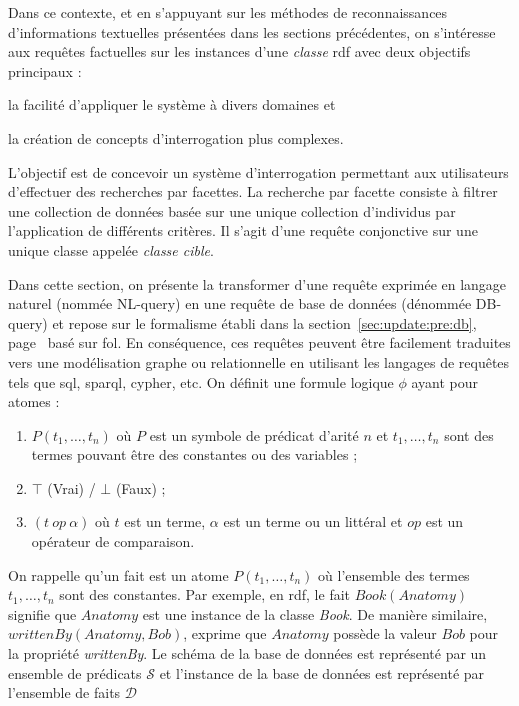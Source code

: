 Dans ce contexte, et en s'appuyant sur les méthodes de reconnaissances d'informations textuelles présentées dans les sections précédentes, on s'intéresse aux requêtes factuelles sur les instances d'une \emph{classe} \gls{rdf} avec deux objectifs principaux :
\begin{enumerate*}[label=(\roman*)]
    \item la facilité d'appliquer le système à divers domaines et
    \item la création de concepts d'interrogation plus complexes.
\end{enumerate*}
L'objectif est de concevoir un système d'interrogation permettant aux utilisateurs d'effectuer des recherches par facettes.
La recherche par facette consiste à filtrer une collection de données basée sur une unique collection d'individus par l'application de différents critères.
Il s'agit d'une requête conjonctive sur une unique classe appelée \emph{classe cible}.

Dans cette section, on présente la transformer d'une requête exprimée en langage naturel (nommée NL-query) en une requête de base de données (dénommée DB-query) \cite{amaviNaturalLanguageQuerying2020} et repose sur le formalisme établi dans la section~\ref{sec:update:pre:db}, page~\pageref{sec:update:pre:db} basé sur \gls{fol}.
En conséquence, ces requêtes peuvent être facilement traduites vers une modélisation graphe ou relationnelle en utilisant les langages de requêtes tels que \gls{sql}, \gls{sparql}, \gls{cypher}, etc.
On définit une formule logique $\phi$ ayant pour atomes :
\begin{enumerate}
    \item $P(t_1, \dots, t_n)$ où $P$ est un symbole de prédicat d'arité $n$ et $t_1, \dots, t_n$ sont des termes pouvant être des constantes ou des variables ;
    \item $\top$ (Vrai) / $\bot$ (Faux) ;
    \item $(t\ op\ \alpha)$ où $t$ est un terme, $\alpha$ est un terme ou un littéral et $op$ est un opérateur de comparaison.
\end{enumerate}
On rappelle qu'un fait est un atome $P(t_1, \dots, t_n)$ où l'ensemble des termes $t_1, \dots, t_n$ sont des constantes.
Par exemple, en \gls{rdf}, le fait $Book(Anatomy)$ signifie que $Anatomy$ est une instance de la classe \emph{Book}.
De manière similaire, $writtenBy(Anatomy, Bob)$, exprime que $Anatomy$ possède la valeur $Bob$ pour la propriété \textit{writtenBy}.
Le schéma de la base de données est représenté par un ensemble de prédicats $\mathcal{S}$ et l'instance de la base de données est représenté par l'ensemble de faits $\mathcal{D}$

